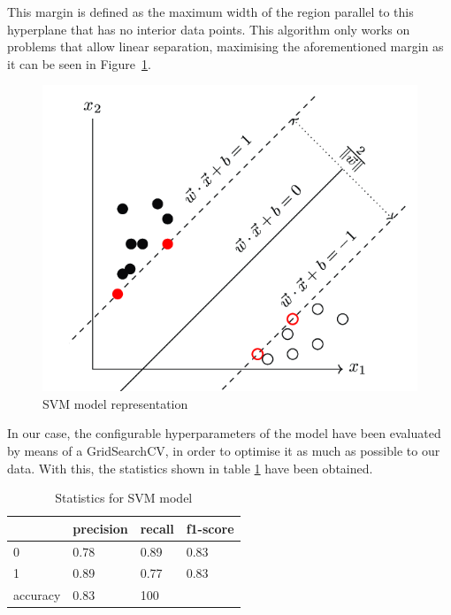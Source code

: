 This margin is defined as the maximum width of the region parallel to this hyperplane that has no interior data points. This algorithm only works on problems that allow linear separation, maximising the aforementioned margin as it can be seen in Figure~\ref{fig:SVM}.

\begin{figure}[!htp]
    \centering
    \includegraphics[scale=0.4]{img/detection/SVM.png}
    \caption{SVM model representation}
    \label{fig:SVM}
\end{figure}

In our case, the configurable hyperparameters of the model have been evaluated by means of a GridSearchCV, in order to optimise it as much as possible to our data. With this, the statistics shown in table \ref{tab:SVM-statistics} have been obtained.

\begin{table}[!htp]
\centering
\begin{tabular}{|l|l|l|l|}
\hline
         & precision & recall & f1-score \\ \hline
0        & 0.78      & 0.89   & 0.83     \\ \hline
1        & 0.89      & 0.77   & 0.83     \\ \hline
accuracy & 0.83      & 100    &          \\ \hline
\end{tabular}
\caption{Statistics for SVM model}
\label{tab:SVM-statistics}
\end{table}

